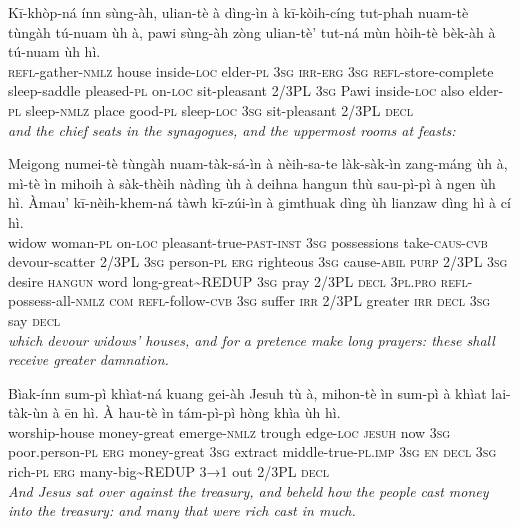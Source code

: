 \documentclass[11pt,a4paper]{article}
\begin{document}
\begin{exe}
\gll Kī-khòp-ná ínn sùng-àh, ulian-tè à dìng-ìn à kī-kòih-cíng tut-phah nuam-tè tùngàh tú-nuam ùh à, pawi sùng-àh zòng ulian-tè' tut-ná mùn hòih-tè bèk-àh à tú-nuam ùh hì. \\
     \textsc{refl}-gather-\textsc{nmlz} house inside-\textsc{loc} elder-\textsc{pl} \textsc{3sg} \textsc{irr}-\textsc{erg} \textsc{3sg} \textsc{refl}-store-complete sleep-saddle pleased-\textsc{pl} on-\textsc{loc} sit-pleasant 2/3PL \textsc{3sg} Pawi inside-\textsc{loc} also elder-\textsc{pl} sleep-\textsc{nmlz} place good-\textsc{pl} sleep-\textsc{loc} \textsc{3sg} sit-pleasant 2/3PL \textsc{decl} \\
\glt \textcolor{kjvcolor}{\textit{and the chief seats in the synagogues, and the uppermost rooms at feasts:}}

\gll Meigong numei-tè tùngàh nuam-tàk-sá-ìn à nèih-sa-te làk-sàk-ìn zang-máng ùh à, mì-tè ìn mihoih à sàk-thèih nàdìng ùh à deihna hangun thù sau-pì-pì à ngen ùh hì. Àmau' kī-nèih-khem-ná tàwh kī-zúi-ìn à gimthuak dìng ùh lianzaw dìng hì à cí hì. \\
     widow woman-\textsc{pl} on-\textsc{loc} pleasant-true-\textsc{past}-\textsc{inst} \textsc{3sg} possessions take-\textsc{caus}-\textsc{cvb} devour-scatter 2/3PL \textsc{3sg} person-\textsc{pl} \textsc{erg} righteous \textsc{3sg} cause-\textsc{abil} \textsc{purp} 2/3PL \textsc{3sg} desire \textsc{hangun} word long-great\textasciitilde{}REDUP \textsc{3sg} pray 2/3PL \textsc{decl} \textsc{3pl}.\textsc{pro} \textsc{refl}-possess-all-\textsc{nmlz} \textsc{com} \textsc{refl}-follow-\textsc{cvb} \textsc{3sg} suffer \textsc{irr} 2/3PL greater \textsc{irr} \textsc{decl} \textsc{3sg} say \textsc{decl} \\
\glt \textcolor{kjvcolor}{\textit{which devour widows' houses, and for a pretence make long prayers: these shall receive greater damnation.}}

\gll Bìak-ínn sum-pì khìat-ná kuang gei-àh Jesuh tù à, mihon-tè ìn sum-pì à khìat lai-tàk-ùn à ēn hì. À hau-tè ìn tám-pì-pì hòng khìa ùh hì. \\
     worship-house money-great emerge-\textsc{nmlz} trough edge-\textsc{loc} \textsc{jesuh} now \textsc{3sg} poor.person-\textsc{pl} \textsc{erg} money-great \textsc{3sg} extract middle-true-\textsc{pl}.\textsc{imp} \textsc{3sg} \textsc{en} \textsc{decl} \textsc{3sg} rich-\textsc{pl} \textsc{erg} many-big\textasciitilde{}REDUP \textsc{3→1} out 2/3PL \textsc{decl} \\
\glt \textcolor{kjvcolor}{\textit{And Jesus sat over against the treasury, and beheld how the people cast money into the treasury: and many that were rich cast in much.}}


\end{exe}
\end{document}
